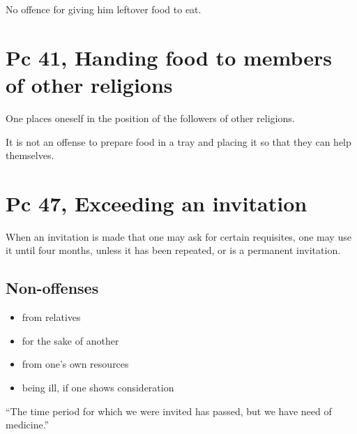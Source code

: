 No offence for giving him leftover food to eat.

\section{Pc 41, Handing food to members of other religions}

One places oneself in the position of the followers of other religions.

It is not an offense to prepare food in a tray and placing it so that
they can help themselves.

\clearpage

\section{Pc 47, Exceeding an invitation}

When an invitation is made that one may ask for certain requisites, one
may use it until four months, unless it has been repeated, or is a
permanent invitation.

\subsection{Non-offenses}

\begin{multicols}{2}

\begin{itemize}
\tightlist
\item
  from relatives
\item
  for the sake of another
\item
  from one's own resources
\item
  being ill, if one shows consideration
\end{itemize}

\end{multicols}

``The time period for which we were invited has passed, but we have need
of medicine.''

